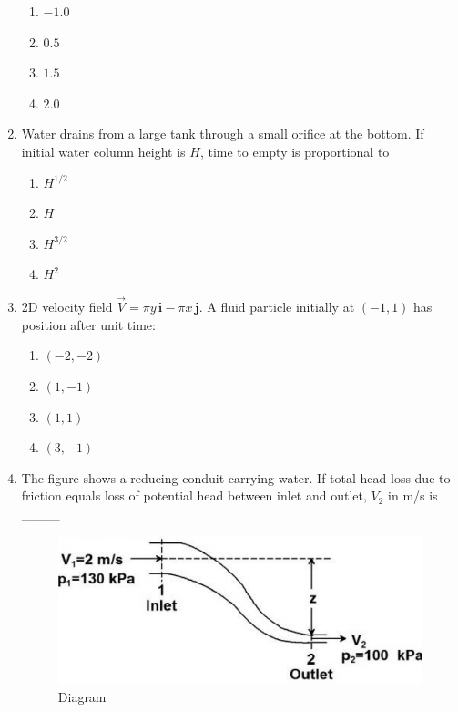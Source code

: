 \documentclass[journal,12pt,onecolumn]{IEEEtran}
\begin{document}
\begin{enumerate}[label=\arabic*)]
\vspace{0.2cm}
\begin{enumerate}[label=\alph*)]
\item $-1.0$
\item $0.5$
\item $1.5$
\item $2.0$
\end{enumerate}

\newpage

\item Water drains from a large tank through a small orifice at the bottom. If initial water column height is $H$, time to empty is proportional to  
\hfill{} \\

\vspace{0.2cm}
\begin{enumerate}[label=\alph*)]
\item $H^{1/2}$
\item $H$
\item $H^{3/2}$
\item $H^2$
\end{enumerate}
\vspace{0.5cm}

\item 2D velocity field $\vec{V} = \pi y \,\mathbf{i} - \pi x\,\mathbf{j}$. A fluid particle initially at $(-1,1)$ has position after unit time:
\vspace{0.2cm}
\hfill{} \\

\begin{enumerate}[label=\alph*)]
\item $(-2,-2)$
\item $(1,-1)$
\item $(1,1)$
\item $(3,-1)$
\end{enumerate}
\vspace{0.5cm}

\item The figure shows a reducing conduit carrying water. If total head loss due to friction equals loss of potential head between inlet and outlet, $V_2$ in m/s is \_\_\_\_

\begin{figure}[htbp]
  \centering
  \includegraphics[width=.68\linewidth]{figs/B/fig4.png} 
  \caption{Diagram}
  \label{B/fig4}
\end{figure}
\hfill{} \\


\end{enumerate}
\end{document}
